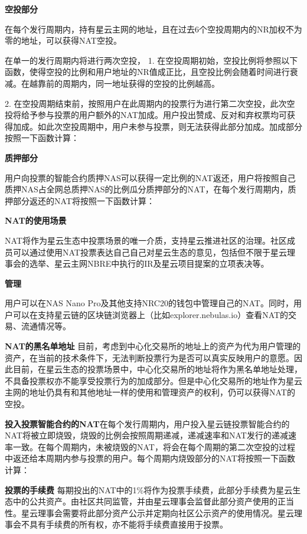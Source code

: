 \textbf{空投部分}

在每个发行周期内，持有星云主网的地址，且在过去6个空投周期内的NR加权不为零的地址，可以获得NAT空投。

在单一的发行周期内将进行两次空投，
1. 在空投周期初始，空投比例将参照以下函数，使得空投的比例和用户地址的NR值成正比，且空投比例会随着时间进行衰减。在越靠前的周期内，同一地址获得的空投的比例越高。

2. 在空投周期结束前，按照用户在此周期内的投票行为进行第二次空投，此次空投将给予参与投票的用户额外的NAT加成。用户投出赞成、反对和弃权票均可获得加成。如此次空投周期中，用户未参与投票，则无法获得此部分加成。加成部分按照一下函数计算：

\textbf{质押部分}

用户向投票的智能合约质押NAS可以获得一定比例的NAT返还，用户将按照自己质押NAS占全网总质押NAS的比例瓜分质押部分的NAT，在每个发行周期内，质押部分返还的NAT将按照一下函数计算：

\textbf{NAT的使用场景}

NAT将作为星云生态中投票场景的唯一介质，支持星云推进社区的治理。社区成员可以通过使用NAT投票表达自己自己对星云生态的意见，包括但不限于星云理事会的选举、星云主网NBRE中执行的IR及星云项目提案的立项表决等。

\textbf{管理}

用户可以在NAS Nano Pro及其他支持NRC20的钱包中管理自己的NAT。同时，用户可以在支持星云链的区块链浏览器上（比如explorer.nebulas.io）查看NAT的交易、流通情况等。

\textbf{NAT的黑名单地址}
目前，考虑到中心化交易所的地址上的资产为代为用户管理的资产，在当前的技术条件下，无法判断投票行为是否可以真实反映用户的意愿。因此目前，在星云生态的投票场景中，中心化交易所的地址将作为黑名单地址处理，不具备投票权亦不能享受投票行为的加成部分。但是中心化交易所的地址作为星云主网的地址仍具有和其他地址一样的使用和管理资产的权利，仍可以获得NAT的空投。

\textbf{投入投票智能合约的NAT}在每个发行周期内，用户投入星云链投票智能合约的NAT将被立即烧毁，烧毁的比例会按照周期递减，递减速率和NAT发行的递减速率一致。在每个周期内，未被烧毁的NAT，将会在每个周期的第二次空投的过程中返还给本周期内参与投票的用户。每个周期内烧毁部分的NAT将按照一下函数计算：

\textbf{投票的手续费}
每期投出的NAT中的1\%将作为投票手续费，此部分手续费为星云生态中的公共资产。由社区共同监管，并由星云理事会监督此部分资产使用的正当性。星云理事会需要将此部分资产公示并定期向社区公示资产的使用情况。星云理事会不具有手续费的所有权，亦不能将手续费直接用于投票。

